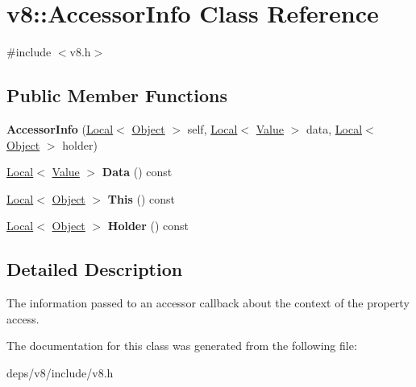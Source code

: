 \hypertarget{classv8_1_1_accessor_info}{}\section{v8\+:\+:Accessor\+Info Class Reference}
\label{classv8_1_1_accessor_info}


{\ttfamily \#include $<$v8.\+h$>$}

\subsection*{Public Member Functions}
\begin{DoxyCompactItemize}
\item 
\hypertarget{classv8_1_1_accessor_info_a7ece98af5112cb0e7d1e5c2d6ca4e0a2}{}{\bfseries Accessor\+Info} (\hyperlink{classv8_1_1_local}{Local}$<$ \hyperlink{classv8_1_1_object}{Object} $>$ self, \hyperlink{classv8_1_1_local}{Local}$<$ \hyperlink{classv8_1_1_value}{Value} $>$ data, \hyperlink{classv8_1_1_local}{Local}$<$ \hyperlink{classv8_1_1_object}{Object} $>$ holder)\label{classv8_1_1_accessor_info_a7ece98af5112cb0e7d1e5c2d6ca4e0a2}

\item 
\hypertarget{classv8_1_1_accessor_info_a5731988db2cf66eb3cc7f757832d12f9}{}\hyperlink{classv8_1_1_local}{Local}$<$ \hyperlink{classv8_1_1_value}{Value} $>$ {\bfseries Data} () const \label{classv8_1_1_accessor_info_a5731988db2cf66eb3cc7f757832d12f9}

\item 
\hypertarget{classv8_1_1_accessor_info_afc7740ab0665f232f9f956a7e3ac6422}{}\hyperlink{classv8_1_1_local}{Local}$<$ \hyperlink{classv8_1_1_object}{Object} $>$ {\bfseries This} () const \label{classv8_1_1_accessor_info_afc7740ab0665f232f9f956a7e3ac6422}

\item 
\hypertarget{classv8_1_1_accessor_info_a1305bf63887da131db381122d34c7193}{}\hyperlink{classv8_1_1_local}{Local}$<$ \hyperlink{classv8_1_1_object}{Object} $>$ {\bfseries Holder} () const \label{classv8_1_1_accessor_info_a1305bf63887da131db381122d34c7193}

\end{DoxyCompactItemize}


\subsection{Detailed Description}
The information passed to an accessor callback about the context of the property access. 

The documentation for this class was generated from the following file\+:\begin{DoxyCompactItemize}
\item 
deps/v8/include/v8.\+h\end{DoxyCompactItemize}
